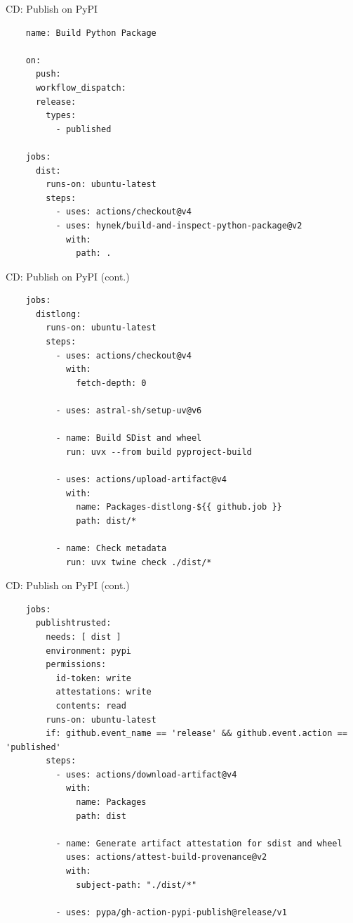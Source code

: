\begin{darkframe}[fragile]{CD: Publish on PyPI}
  \begin{verbatim}
    name: Build Python Package

    on:
      push:
      workflow_dispatch:
      release:
        types:
          - published

    jobs:
      dist:
        runs-on: ubuntu-latest
        steps:
          - uses: actions/checkout@v4
          - uses: hynek/build-and-inspect-python-package@v2
            with:
              path: .
  \end{verbatim}
\end{darkframe}

\begin{darkframe}{CD: Publish on PyPI (cont.)}
  \begin{verbatim}
    jobs:
      distlong:
        runs-on: ubuntu-latest
        steps:
          - uses: actions/checkout@v4
            with:
              fetch-depth: 0

          - uses: astral-sh/setup-uv@v6

          - name: Build SDist and wheel
            run: uvx --from build pyproject-build

          - uses: actions/upload-artifact@v4
            with:
              name: Packages-distlong-${{ github.job }}
              path: dist/*

          - name: Check metadata
            run: uvx twine check ./dist/*
  \end{verbatim}
\end{darkframe}

\begin{darkframe}{CD: Publish on PyPI (cont.)}
  \begin{verbatim}
    jobs:
      publishtrusted:
        needs: [ dist ]
        environment: pypi
        permissions:
          id-token: write
          attestations: write
          contents: read
        runs-on: ubuntu-latest
        if: github.event_name == 'release' && github.event.action == 'published'
        steps:
          - uses: actions/download-artifact@v4
            with:
              name: Packages
              path: dist

          - name: Generate artifact attestation for sdist and wheel
            uses: actions/attest-build-provenance@v2
            with:
              subject-path: "./dist/*"

          - uses: pypa/gh-action-pypi-publish@release/v1
  \end{verbatim}
\end{darkframe}

